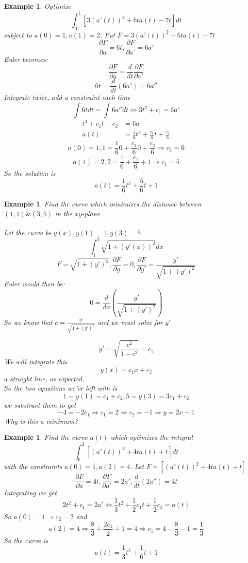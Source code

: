 \documentclass[12pt]{article}
\theoremstyle{plain}
\newtheorem{example}[theorem]{Example}
\theoremstyle{definition}
\begin{document}
\begin{example}
	Optimize
	$$\int^1_0 [3(a'(t))^2 + 6t a(t) - 7t]dt$$
	subject to $a(0)=1, a(1)=2$. Put $F = 3(a'(t))^2 + 6t a(t) - 7t$
	$$\frac{\partial F}{\partial a} = 6t, \frac{\partial F}{\partial a'} = 6a'$$
	Euler becomes:
	$$\frac{\partial F}{\partial a} = \frac{d}{dt} \frac{\partial F}{\partial a'}$$
	$$6t = \frac{d}{dt} (6a') = 6a''$$
	Integrate twice, add a constraint each time
	$$\int 6tdt = \int 6a''dt \Longleftrightarrow 3t^2+c_1 = 6a'$$
	\begin{align*}
		t^3 + c_1 t + c_2 &= 6a\\
		a(t) &= \frac{1}{6}t^3 + \frac{c_1}{6}t + \frac{c_2}{6}
	\end{align*}
	$$a(0)=1, 1 = \frac{1}{6}0 + \frac{c_1}{6}0 + \frac{c_2}{6} \Longrightarrow c_2 = 6$$
	$$a(1)=2, 2 = \frac{1}{6} + \frac{c_1}{6} + 1 \Longrightarrow c_1 = 5$$
	So the solution is
	$$a(t)=\frac{1}{6} t^3 + \frac{5}{6} t + 1$$
\end{example}

\begin{example}
	Find the curve which minimizes the distance between $(1,1) \& (3,5)$ in the $xy$-plane\\
	\\
	Let the curve be $y(x), y(1)=1, y(3)=5$
	$$\int^3_1 \sqrt{1+ (y'(x))^2} dx$$
	$$F = \sqrt{1+ (y')^2}, \frac{\partial F}{\partial y} = 0, \frac{\partial F}{\partial y'} = \frac{y'}{\sqrt{1+ (y')^2}}$$
	Euler would then be:
	$$0 = \frac{d}{dx} (\frac{y'}{\sqrt{1+ (y')^2}})$$
	So we know that $c=\frac{y'}{\sqrt{1+ (y')^2}}$ and we must solve for $y'$

	$$y' = \sqrt{\frac{c^2}{1-c^2}} = c_1$$
	We will integrate this
	$$y(x) = c_1 x + c_2$$
	a straight line, as expected.\\
	So the two equations we've left with is
	$$1=y(1)=c_1 + c_2, 5 = y(3)=3c_1 + c_2$$
	we substract them to get
	$$-4 = -2c_1 \Longrightarrow c_1 = 2 \Longrightarrow c_2 = -1 \Longrightarrow y = 2x-1$$
	Why is this a minimum?
\end{example}

\begin{example}
	Find the curve $a(t)$ which optimizes the integral
	$$\int^2_0 [(a'(t))^2+4ta(t)+t]dt$$
	with the constraints $a(0)=1, a(2)=4$. Let $F = [(a'(t))^2+4ta(t)+t]$
	$$\frac{\partial F}{\partial a} = 4t, \frac{\partial F}{\partial a'} = 2a', \frac{d}{dt} (2a'') = 4t$$
	Integrating we get
	$$2t^2 + c_1 = 2a' \Longleftrightarrow \frac{1}{3}t^2 + \frac{1}{2} c_1 t + \frac{1}{2}c_2 = a(t)$$
	So $a(0)=1 \Longrightarrow c_2 = 2$ and $$a(2)=4 \Longrightarrow \frac{8}{3} + \frac{2c_1}{2} + 1 = 4 \Longrightarrow c_1 = 4 - \frac{8}{3} - 1 = \frac{1}{3}$$
	So the curve is
	$$a(t) = \frac{1}{3}t^3 + \frac{1}{6} t + 1$$
\end{example}
\end{document}
